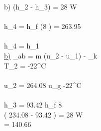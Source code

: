 b) \quad {} (h_2 - h_3) = 28 W \\
 \\
h_4 = h_f (8 ) = 263.95  \\

 \quad {} \\

h_4 = h_1 \\

\underline{b)} \quad {}_{ab} = m (u_2 - u_1) - _k \\

T_2 = -22^\circ C \\

 \\

u_2 = 264.08  \quad u_g  -22^\circ C \\
 \\
h_3 = 93.42  \quad h_f  8  \\

 \left( 234.08  - 93.42  \right) = 28 W \\
= 140.66    \\
 \\
